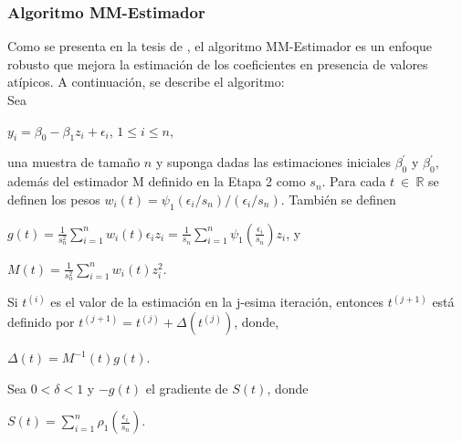 \subsubsection{ Algoritmo MM-Estimador \parencite{zacarias-2023} }
Como se presenta en la tesis de \textcite{zacarias-2023}, el algoritmo MM-Estimador es un enfoque robusto que mejora la estimación de los coeficientes en presencia de valores atípicos. A continuación, se describe el algoritmo:\\

Sea\\
\begin{center}
 $ y_{i} = \beta_{0} -\beta_{1}z_{i} + \epsilon_{i} $, $1 \leq i \leq n $,\\
\end{center}

una muestra de tamaño $n$ y suponga dadas las estimaciones iniciales $\beta_{0}^{'}$ y $\beta_{0}^{'}$, además del estimador M definido en la Etapa 2 como $s_{n}$. Para cada $t \: \in  \: \mathbb{R} $ se definen los pesos
$w_{i}(t) = \psi_{1} (\epsilon_{i} /s_{n}) /(\epsilon_{i} /s_{n})$. También se definen \\


\begin{center}
	$g(t) = \frac{1}{s_{n}^{2}} \sum_{i=1}^{n} w_{i}( t )\epsilon_{i} z_{i} =  \frac{1}{s_{n}}  \sum_{i=1}^{n} \psi_{1} (\frac{\epsilon_{i}}{s_{n}}) z_{i} $, y \\	
\end{center}

\begin{center}
	$ M(t) = \frac{1}{s_{n}^{2}}  \sum_{i=1}^{n}  w_{i}( t ) z_{i}^{2} $.\\
\end{center}





Si $t^{(i)}$ es el valor de la estimación en la j-esima iteración, entonces $t^{(j+1)}$ está definido por $t^{(j+1)} = t^{(j)} + \Delta ( t^{(j)})$, donde,\\

\begin{center}
	$\Delta ( t) = M^{-1}(t)g(t)$.\\
\end{center}

Sea $0< \delta  < 1$  y $-g(t)$ el gradiente de $S(t)$, donde \\

\begin{center}
	$S(t) = \sum_{i=1}^{n} \rho_{1} ( \frac{\epsilon_{i}}{s_{n}})$. \\
\end{center}


